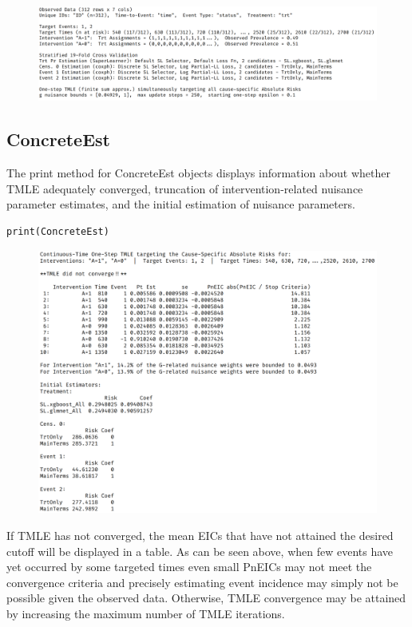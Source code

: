 \documentclass{report}
\newcommand{\1}{\ensuremath{\mathbf{1}}}
\begin{document}
\begin{figure}[H]
\includegraphics[width=\linewidth]{fig/ConcreteArgs.png}
\end{figure}

\subsection{ConcreteEst}
\label{sec:orge61cf9e}
The print method for ConcreteEst objects displays information about whether TMLE adequately converged, truncation of intervention-related nuisance parameter estimates, and the initial estimation of nuisance parameters.

\begin{lstlisting}
print(ConcreteEst)
\end{lstlisting}

\begin{figure}[H]
\center
\includegraphics[width=\linewidth]{fig/ConcreteEst.png}
\end{figure}

If TMLE has not converged, the mean EICs that have not attained the desired cutoff will be displayed in a table. As can be seen above, when few events have yet occurred by some targeted times even small PnEICs may not meet the convergence criteria and precisely estimating event incidence may simply not be possible given the observed data. Otherwise, TMLE convergence may be attained by increasing the maximum number of TMLE iterations.
\end{document}
